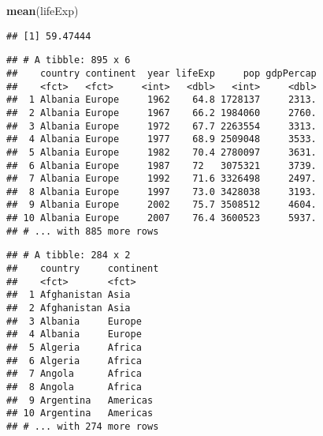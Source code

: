 \documentclass[]{article}
\newenvironment{Shaded}{\begin{snugshade}}{\end{snugshade}}
\newcommand{\DecValTok}[1]{\textcolor[rgb]{0.00,0.00,0.81}{#1}}
\newcommand{\KeywordTok}[1]{\textcolor[rgb]{0.13,0.29,0.53}{\textbf{#1}}}
\newcommand{\NormalTok}[1]{#1}
\newcommand{\OperatorTok}[1]{\textcolor[rgb]{0.81,0.36,0.00}{\textbf{#1}}}
\newcommand{\StringTok}[1]{\textcolor[rgb]{0.31,0.60,0.02}{#1}}
\begin{document}
\begin{Shaded}
\begin{Highlighting}[]
\KeywordTok{mean}\NormalTok{(lifeExp) }
\end{Highlighting}
\end{Shaded}

\begin{verbatim}
## [1] 59.47444
\end{verbatim}

\begin{Shaded}
\end{Shaded}

\begin{verbatim}
## # A tibble: 895 x 6
##    country continent  year lifeExp     pop gdpPercap
##    <fct>   <fct>     <int>   <dbl>   <int>     <dbl>
##  1 Albania Europe     1962    64.8 1728137     2313.
##  2 Albania Europe     1967    66.2 1984060     2760.
##  3 Albania Europe     1972    67.7 2263554     3313.
##  4 Albania Europe     1977    68.9 2509048     3533.
##  5 Albania Europe     1982    70.4 2780097     3631.
##  6 Albania Europe     1987    72   3075321     3739.
##  7 Albania Europe     1992    71.6 3326498     2497.
##  8 Albania Europe     1997    73.0 3428038     3193.
##  9 Albania Europe     2002    75.7 3508512     4604.
## 10 Albania Europe     2007    76.4 3600523     5937.
## # ... with 885 more rows
\end{verbatim}

\begin{Shaded}
\end{Shaded}

\begin{verbatim}
## # A tibble: 284 x 2
##    country     continent
##    <fct>       <fct>    
##  1 Afghanistan Asia     
##  2 Afghanistan Asia     
##  3 Albania     Europe   
##  4 Albania     Europe   
##  5 Algeria     Africa   
##  6 Algeria     Africa   
##  7 Angola      Africa   
##  8 Angola      Africa   
##  9 Argentina   Americas 
## 10 Argentina   Americas 
## # ... with 274 more rows
\end{verbatim}
\end{document}
